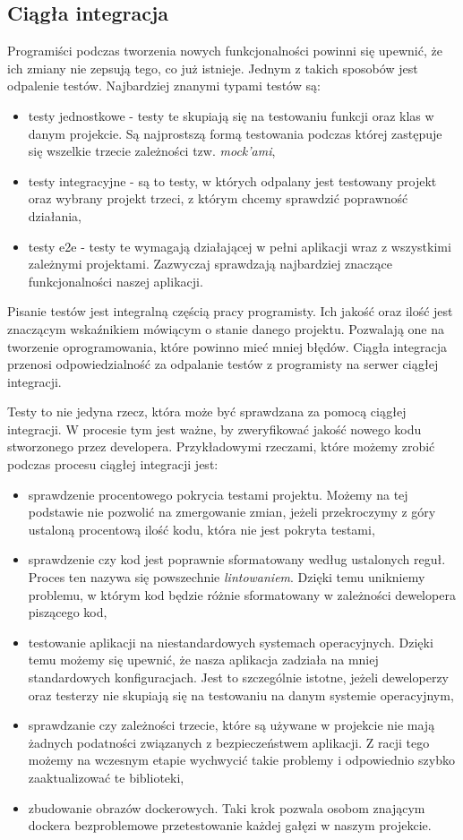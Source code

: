 \subsection{Ciągła integracja}
Programiści podczas tworzenia nowych funkcjonalności powinni się upewnić, że ich zmiany nie zepsują tego, co już istnieje. Jednym z takich sposobów jest odpalenie testów. Najbardziej znanymi typami testów są:
\begin{itemize}
    \item testy jednostkowe - testy te skupiają się na testowaniu funkcji oraz klas w danym projekcie. Są najprostszą formą testowania podczas której zastępuje się wszelkie trzecie zależności tzw. \textit{mock'ami},
    \item testy integracyjne - są to testy, w których odpalany jest testowany projekt oraz wybrany projekt trzeci, z którym chcemy sprawdzić poprawność działania,
    \item testy e2e - testy te wymagają działającej w pełni aplikacji wraz z wszystkimi zależnymi projektami. Zazwyczaj sprawdzają najbardziej znaczące funkcjonalności naszej aplikacji.
\end{itemize}
Pisanie testów jest integralną częścią pracy programisty. Ich jakość oraz ilość jest znaczącym wskaźnikiem mówiącym o stanie danego projektu. Pozwalają one na tworzenie oprogramowania, które powinno mieć mniej błędów. Ciągła integracja przenosi odpowiedzialność za odpalanie testów z programisty na serwer ciągłej integracji.
\par
Testy to nie jedyna rzecz, która może być sprawdzana za pomocą ciągłej integracji. W procesie tym jest ważne, by zweryfikować jakość nowego kodu stworzonego przez developera. Przykładowymi rzeczami, które możemy zrobić podczas procesu ciągłej integracji jest:
\begin{itemize}
    \item sprawdzenie procentowego pokrycia testami projektu. Możemy na tej podstawie nie pozwolić na zmergowanie zmian, jeżeli przekroczymy z góry ustaloną procentową ilość kodu, która nie jest pokryta testami,
    \item sprawdzenie czy kod jest poprawnie sformatowany według ustalonych reguł. Proces ten nazywa się powszechnie \textit{lintowaniem}. Dzięki temu unikniemy problemu, w którym kod będzie różnie sformatowany w zależności dewelopera piszącego kod,
    \item testowanie aplikacji na niestandardowych systemach operacyjnych. Dzięki temu możemy się upewnić, że nasza aplikacja zadziała na mniej standardowych konfiguracjach. Jest to szczególnie istotne, jeżeli deweloperzy oraz testerzy nie skupiają się na testowaniu na danym systemie operacyjnym,
    \item sprawdzanie czy zależności trzecie, które są używane w projekcie nie mają żadnych podatności związanych z bezpieczeństwem aplikacji. Z racji tego możemy na wczesnym etapie wychwycić takie problemy i odpowiednio szybko zaaktualizować te biblioteki,
    \item zbudowanie obrazów dockerowych. Taki krok pozwala osobom znającym dockera bezproblemowe przetestowanie każdej gałęzi w naszym projekcie.
\end{itemize}

